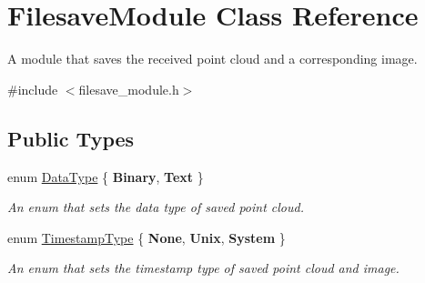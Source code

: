 \hypertarget{classFilesaveModule}{\section{Filesave\-Module Class Reference}
\label{classFilesaveModule}
}


A module that saves the received point cloud and a corresponding image.  




{\ttfamily \#include $<$filesave\-\_\-module.\-h$>$}

\subsection*{Public Types}
\begin{DoxyCompactItemize}
\item 
enum \hyperlink{classFilesaveModule_a268eda9476b90bc83b551c50eb7c67fe}{Data\-Type} \{ {\bfseries Binary}, 
{\bfseries Text}
 \}
\begin{DoxyCompactList}\small\item\em An enum that sets the data type of saved point cloud. \end{DoxyCompactList}\item 
enum \hyperlink{classFilesaveModule_a5c70900e45fc43e441b55ba02fd3ae21}{Timestamp\-Type} \{ {\bfseries None}, 
{\bfseries Unix}, 
{\bfseries System}
 \}
\begin{DoxyCompactList}\small\item\em An enum that sets the timestamp type of saved point cloud and image. \end{DoxyCompactList}\end{DoxyCompactItemize}
